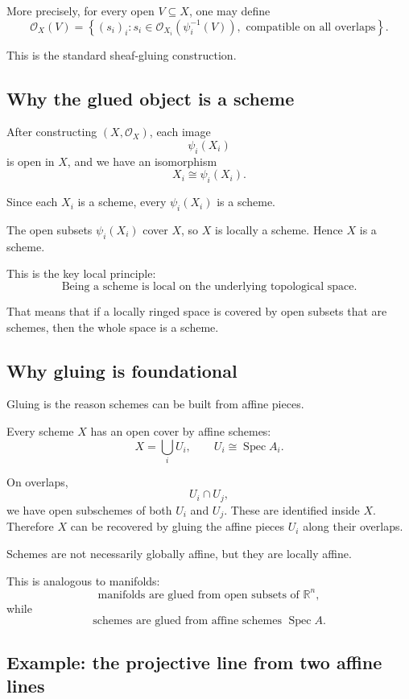 \documentclass[12pt,a4paper]{article}
\newcommand{\OO}{\mathcal{O}}
\newcommand{\Spec}{\operatorname{Spec}}
\theoremstyle{notespace}
\begin{document}
More precisely, for every open \(V\subseteq X\), one may define
\[
\OO_X(V)
=
\left\{
(s_i)_i:
s_i\in\OO_{X_i}(\psi_i^{-1}(V)),
\text{ compatible on all overlaps}
\right\}.
\]

This is the standard sheaf-gluing construction.

\subsection{Why the glued object is a scheme}

After constructing \((X,\OO_X)\), each image
\[
\psi_i(X_i)
\]
is open in \(X\), and we have an isomorphism
\[
X_i\cong\psi_i(X_i).
\]

Since each \(X_i\) is a scheme, every \(\psi_i(X_i)\) is a scheme.

The open subsets \(\psi_i(X_i)\) cover \(X\), so \(X\) is locally a scheme. Hence \(X\) is a scheme.

This is the key local principle:
\[
\boxed{
	\text{Being a scheme is local on the underlying topological space.}
}
\]

That means that if a locally ringed space is covered by open subsets that are schemes, then the whole space is a scheme.

\subsection{Why gluing is foundational}

Gluing is the reason schemes can be built from affine pieces.

Every scheme \(X\) has an open cover by affine schemes:
\[
X=\bigcup_i U_i,
\qquad
U_i\cong\Spec A_i.
\]

On overlaps,
\[
U_i\cap U_j,
\]
we have open subschemes of both \(U_i\) and \(U_j\). These are identified inside \(X\). Therefore \(X\) can be recovered by gluing the affine pieces \(U_i\) along their overlaps.

Schemes are not necessarily globally affine, but they are locally affine.

This is analogous to manifolds:
\[
\boxed{
	\text{manifolds are glued from open subsets of }\mathbb R^n,
}
\]
while
\[
\boxed{
	\text{schemes are glued from affine schemes }\Spec A.
}
\]

\subsection{Example: the projective line from two affine lines}
\end{document}
